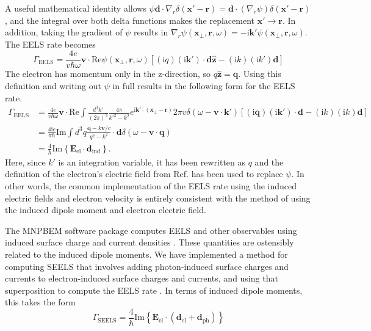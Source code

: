 \documentclass [11pt, proquest] {uwthesis}[2016/11/22]
\begin{document}
A useful mathematical identity allows $\psi\textbf{d}\cdot\nabla_r\delta(\textbf{x}'-\textbf{r}) = \textbf{d}\cdot(\nabla_r\psi)\delta(\textbf{x}'-\textbf{r})$, and the integral over both delta functions makes the replacement $\textbf{x}' \rightarrow \textbf{r}$. In addition, taking the gradient of $\psi$ results in $\nabla_r\psi(\textbf{x}_{\perp},\textbf{r},\omega) = -\textrm{i}\textbf{k}'\psi(\textbf{x}_{\perp},\textbf{r},\omega)$. The EELS rate becomes
\begin{equation}
\Gamma_{\textrm{EELS}} = \frac{4e}{v\hbar\omega}\textbf{v}\cdot \textrm{Re}\psi(\textbf{x}_{\perp},\textbf{r},\omega) \left[(\textrm{i}q)(\textrm{i}\textbf{k}') \cdot \textbf{d}\hat{\textbf{z}} - (\textrm{i}k)(\textrm{i}k')\textbf{d}\right]
\end{equation}
The electron has momentum only in the z-direction, so $q\hat{\textbf{z}} = \textbf{q}$. Using this definition and writing out $\psi$ in full results in the following form for the EELS rate.
\begin{equation}
\begin{aligned}
\Gamma_{\textrm{EELS}} &= \frac{4e}{v\hbar\omega}\textbf{v}\cdot \textrm{Re}\int \frac{d^3k'}{(2\pi)^3} \frac{4\pi}{k'^2 - k^2} e^{\textrm{i}\textbf{k}'\cdot(\textbf{x}_{\perp}-\textbf{r})} 2\pi v \delta(\omega-\textbf{v}\cdot\textbf{k}') \left[(\textrm{i}\textbf{q})(\textrm{i}\textbf{k}') \cdot \textbf{d} - (\textrm{i}k)(\textrm{i}k)\textbf{d}\right]\\
&= \frac{4\textrm{i}e}{\pi\hbar} \textrm{Im}\int d^3q \frac{\textbf{q} - k\textbf{v}/c}{q^2 - k^2} \cdot \textbf{d} \delta(\omega - \textbf{v} \cdot \textbf{q})\\
&= \frac{4}{\hbar}\textrm{Im}\left\{ \textbf{E}_{\textrm{el}} \cdot \textbf{d}_{\textrm{ind}}\right\}.
\end{aligned}
\end{equation}
Here, since $k'$ is an integration variable, it has been rewritten as $q$ and the definition of the electron's electric field from Ref. \cite{AbajoRevMod} has been used to replace $\psi$. In other words, the common implementation of the EELS rate using the induced electric fields and electron velocity is entirely consistent with the method of using the induced dipole moment and electron electric field.

The MNPBEM software package computes EELS and other observables using induced surface charge and current densities \cite{Hohenester2012,Hohenester2014}. These quantities are ostensibly related to the induced dipole moments. We have implemented a method for computing SEELS that involves adding photon-induced surface charges and currents to electron-induced surface charges and currents, and using that superposition to compute the EELS rate \cite{vanAiken}. In terms of induced dipole moments, this takes the form
\begin{equation}
\Gamma_{\textrm{SEELS}} = \frac{4}{\hbar}\textrm{Im}\left\{ \textbf{E}_{\textrm{el}} \cdot (\textbf{d}_{\textrm{el}}+\textbf{d}_{\textrm{ph}})\right\}
\label{eels_dipoles}
\end{equation}
\end{document}
